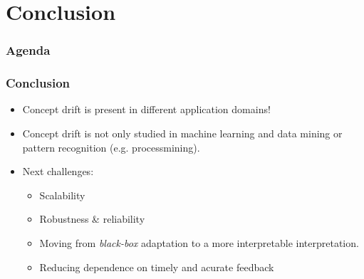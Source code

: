 \section{Conclusion}

\begin{frame}
\frametitle{Agenda}
\tableofcontents[currentsection]
\end{frame}


\begin{frame}
\frametitle{Conclusion}

\begin{itemize}
\item Concept drift is present in different application domains!
\item<2,3> Concept drift is not only studied in machine learning and data mining or pattern recognition (e.g. processmining).
\item<3> Next challenges:
	\begin{itemize}
	\item Scalability
	\item Robustness \& reliability
	\item Moving from \textit{black-box} adaptation to a more interpretable interpretation.
	\item Reducing dependence on timely and acurate feedback
	\end{itemize}
\end{itemize}
\end{frame}